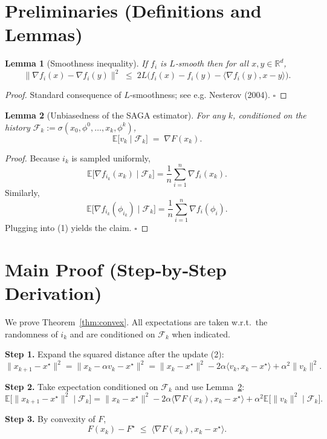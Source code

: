 \documentclass{article}
\newtheorem{lemma}{Lemma}
\newcommand{\E}{\mathbb{E}}
\newcommand{\R}{\mathbb{R}}
\begin{document}
\vspace{0.5em}
\section*{Preliminaries (Definitions and Lemmas)}
\begin{lemma}[Smoothness inequality]\label{lem:smooth}
If $f_i$ is $L$‑smooth then for all $x,y\in\R^d$,
\[
\|\nabla f_i(x)-\nabla f_i(y)\|^2\;\le\;2L\bigl(f_i(x)-f_i(y)-\langle\nabla f_i(y),x-y\rangle\bigr).
\tag{L1}
\]
\end{lemma}
\begin{proof}
Standard consequence of $L$‑smoothness; see e.g. Nesterov (2004). \hfill $\square$
\end{proof}

\begin{lemma}[Unbiasedness of the SAGA estimator]\label{lem:unbiased}
For any $k$, conditioned on the history $\mathcal{F}_k:=\sigma(x_0,\phi^0,\dots,x_k,\phi^k)$,
\[
\E\!\big[v_k\mid\mathcal{F}_k\big]\;=\;\nabla F(x_k).
\tag{L2}
\]
\end{lemma}
\begin{proof}
Because $i_k$ is sampled uniformly,
\[
\E\!\big[\nabla f_{i_k}(x_k)\mid\mathcal{F}_k\big]=\frac1n\sum_{i=1}^n\nabla f_i(x_k).
\]
Similarly,
\[
\E\!\big[\nabla f_{i_k}(\phi_{i_k})\mid\mathcal{F}_k\big]=\frac1n\sum_{i=1}^n\nabla f_i(\phi_i).
\]
Plugging into (1) yields the claim. \hfill $\square$
\end{proof}

\section*{Main Proof (Step‑by‑Step Derivation)}
We prove Theorem~\ref{thm:convex}. All expectations are taken w.r.t.\ the randomness of $i_k$ and are conditioned on $\mathcal{F}_k$ when indicated.

\medskip
\noindent\textbf{Step 1.} Expand the squared distance after the update (2):
\[
\|x_{k+1}-x^\star\|^2
 =\|x_k-\alpha v_k-x^\star\|^2
 =\|x_k-x^\star\|^2-2\alpha\langle v_k,x_k-x^\star\rangle+\alpha^2\|v_k\|^2 .
\tag{S1}
\]

\noindent\textbf{Step 2.} Take expectation conditioned on $\mathcal{F}_k$ and use Lemma~\ref{lem:unbiased}:
\[
\E\!\big[\|x_{k+1}-x^\star\|^2\mid\mathcal{F}_k\big]
 =\|x_k-x^\star\|^2-2\alpha\langle\nabla F(x_k),x_k-x^\star\rangle
     +\alpha^2\E\!\big[\|v_k\|^2\mid\mathcal{F}_k\big].
\tag{S2}
\]

\noindent\textbf{Step 3.} By convexity of $F$, 
\[
F(x_k)-F^\star\;\le\;\langle\nabla F(x_k),x_k-x^\star\rangle .
\tag{S3}
\]
\end{document}
